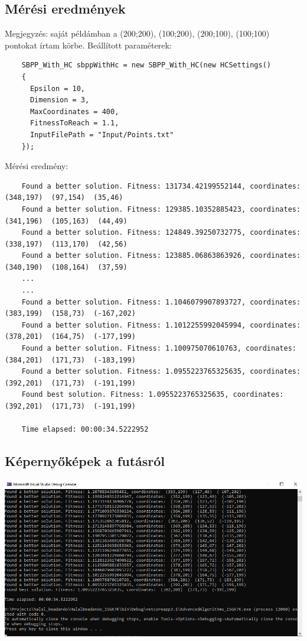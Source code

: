 \documentclass{article}
\begin{document}
  \subsection{Mérési eredmények}
  Megjegyzés: saját példámban a (200;200), (100;200), (200;100), (100;100) pontokat írtam körbe.
  \newline Beállított paraméterek:
  \begin{lstlisting}
    SBPP_With_HC sbppWithHc = new SBPP_With_HC(new HCSettings()
    {
      Epsilon = 10,
      Dimension = 3,
      MaxCoordinates = 400,
      FitnessToReach = 1.1,
      InputFilePath = "Input/Points.txt"
    });
  \end{lstlisting}
  Mérési eredmény:
  \begin{lstlisting}
    Found a better solution. Fitness: 131734.42199552144, coordinates:  (348,197)  (97,154)  (35,46)
    Found a better solution. Fitness: 129385.10352885423, coordinates:  (341,196)  (105,163)  (44,49)
    Found a better solution. Fitness: 124849.39250732775, coordinates:  (338,197)  (113,170)  (42,56)
    Found a better solution. Fitness: 123885.06863863926, coordinates:  (340,190)  (108,164)  (37,59)
    ...
    ...
    Found a better solution. Fitness: 1.1046079907893727, coordinates:  (383,199)  (158,73)  (-167,202)
    Found a better solution. Fitness: 1.1012255992045994, coordinates:  (378,201)  (164,75)  (-177,199)
    Found a better solution. Fitness: 1.100975070610763, coordinates:  (384,201)  (171,73)  (-183,199)
    Found a better solution. Fitness: 1.0955223765325635, coordinates:  (392,201)  (171,73)  (-191,199)
    Found best solution. Fitness: 1.0955223765325635, coordinates:  (392,201)  (171,73)  (-191,199)

    Time elapsed: 00:00:34.5222952
  \end{lstlisting}
  \subsection{Képernyőképek a futásról}
  \includegraphics[width=1.0\textwidth]{hillclimbing}
\end{document}
